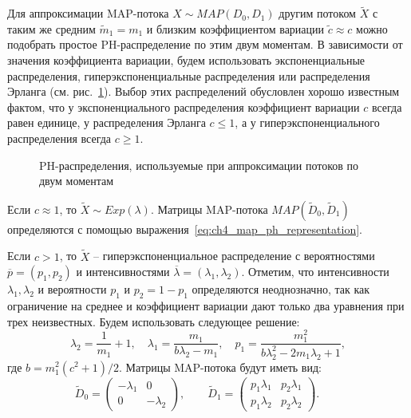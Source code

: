 Для аппроксимации MAP-потока $X \sim MAP(D_0, D_1)$ другим потоком $\tilde{X}$ с таким же средним $\tilde{m}_1 = m_1$ и близким коэффициентом вариации $\tilde{c} \approx c$ можно подобрать простое PH-распределение по этим двум моментам. В зависимости от значения коэффициента вариации, будем использовать экспоненциальные распределения, гиперэкспоненциальные распределения или распределения Эрланга (см. рис.~\ref{fig:ch4_ph2}). Выбор этих распределений обусловлен хорошо известным фактом, что у экспоненциального распределения коэффициент вариации $c$ всегда равен единице, у распределения Эрланга $c \leqslant 1$, а у гиперэкспоненциального распределения всегда $c \geqslant 1$.

\begin{figure}[h]
  \caption{PH-распределения, используемые при аппроксимации потоков по двум моментам}
  \label{fig:ch4_ph2}
\end{figure}

Если $c \approx 1$, то $\tilde{X} \sim Exp(\lambda)$. Матрицы MAP-потока $MAP(\tilde{D}_0, \tilde{D}_1)$ определяются с помощью выражения~\eqref{eq:ch4_map_ph_representation}.

Если $c > 1$, то $\tilde{X}$ -- гиперэкспоненциальное распределение с вероятностями $\overline{p} = (p_1, p_2)$ и интенсивностями $\overline{\lambda} = (\lambda_1, \lambda_2)$. Отметим, что интенсивности $\lambda_1, \lambda_2$ и вероятности $p_1$ и $p_2 = 1 - p_1$ определяются неоднозначно, так как ограничение на среднее и коэффициент вариации дают только два уравнения при трех неизвестных. Будем использовать следующее решение:
$$
\lambda_2 = \frac{1}{m_1} + 1,\quad \lambda_1 = \frac{m_1}{b \lambda_2 - m_1}, \quad p_1 = \frac{m_1^2}{b \lambda_2^2 - 2 m_1 \lambda_2 + 1},
$$
где $b = m_1^2(c^2 + 1) / 2$. Матрицы MAP-потока будут иметь вид:
$$
\tilde{D}_0 = \left(
    \begin{matrix}
        -\lambda_1 & 0\\
        0 & -\lambda_2
    \end{matrix}
    \right),\qquad
\tilde{D}_1 = \left(
    \begin{matrix}
        p_1 \lambda_1 & p_2 \lambda_1\\
        p_1 \lambda_2 & p_2 \lambda_2
    \end{matrix}
    \right).\qquad
$$

